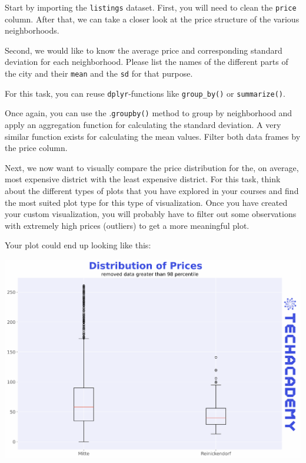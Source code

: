 \documentclass[
  11pt,
]{article}
\newenvironment{tips}[1]
  {
  \begin{itemize}
  \footnotesize
  \renewcommand{\labelitemi}{
    \raisebox{-.7\height}[0pt][0pt]{
      {\setkeys{Gin}{width=3em,keepaspectratio}
        \texttt{[image: images/\#1.png]}}
    }
  }
  \setlength{\fboxsep}{1em}
  \begin{rbox}
  \item
  }
  {
  \end{rbox}
  \end{itemize}
  }
\newenvironment{tipsp}[1]
  {
  \begin{itemize}
  \footnotesize
  \renewcommand{\labelitemi}{
    \raisebox{-.7\height}[0pt][0pt]{
      {\setkeys{Gin}{width=3em,keepaspectratio}
        \texttt{[image: images/\#1.png]}}
    }
  }
  \setlength{\fboxsep}{1em}
  \begin{pbox}
  \item
  }
  {
  \end{pbox}
  \end{itemize}
  }
\begin{document}
Start by importing the \texttt{listings} dataset.
First, you will need to clean the \texttt{price} column.
After that, we can take a closer look at the price structure of the various neighborhoods.

Second, we would like to know the average price and corresponding standard deviation for each neighborhood.
Please list the names of the different parts of the city and their \texttt{mean} and the \texttt{sd} for that purpose.

\begin{tips}r
For this task, you can reuse \texttt{dplyr}-functions like \texttt{group\_by()} or \texttt{summarize()}.

\end{tips}

\begin{tipsp}p
Once again, you can use the .\texttt{groupby()} method to group by neighborhood and apply an aggregation function for calculating the standard deviation.
A very similar function exists for calculating the mean values.
Filter both data frames by the price column.

\end{tipsp}

Next, we now want to visually compare the price distribution for the, on average, most expensive district with the least expensive district.
For this task, think about the different types of plots that you have explored in your courses and find the most suited plot type for this type of visualization.
Once you have created your custom visualization, you will probably have to filter out some observations with extremely high prices (outliers) to get a more meaningful plot.

Your plot could end up looking like this:

\begin{center}\includegraphics[width=1\linewidth]{plot/01_python/box_plots} \end{center}
\end{document}
